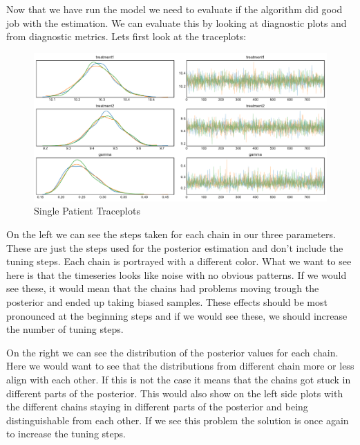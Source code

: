 \documentclass[12pt,a4paper,leqno]{report}
\theoremstyle{plain}
\theoremstyle{definition}
\theoremstyle{remark}
\begin{document}
Now that we have run the model we need to evaluate if the algorithm did good job with
the estimation. We can evaluate this by looking at diagnostic plots and from diagnostic
metrics. Lets first look at the traceplots:

\begin{figure}[!h]
    \caption{Single Patient Traceplots}
    \includegraphics[width=\textwidth,height=\textheight,keepaspectratio]{single_patient_no_trend_traceplot.pdf}
\end{figure}

On the left we can see the steps taken for each chain in our three parameters. These are
just the steps used for the posterior estimation and don't include the tuning steps. Each
chain is portrayed with a different color. What we want to see here is that the timeseries
looks like noise with no obvious patterns. If we would see these, it would mean that the
chains had problems moving trough the posterior and ended up taking biased samples.
These effects should be most pronounced at the beginning steps and if we would see
these, we should increase the number of tuning steps.

On the right we can see the distribution of the posterior values for each chain. Here we
would want to see that the distributions from different chain more or less align with
each other. If this is not the case it means that the chains got stuck in different
parts of the posterior. This would also show on the left side plots with the different
chains staying in different parts of the posterior and being distinguishable from each
other. If we see this problem the solution is once again to increase the tuning steps.




\end{document}
